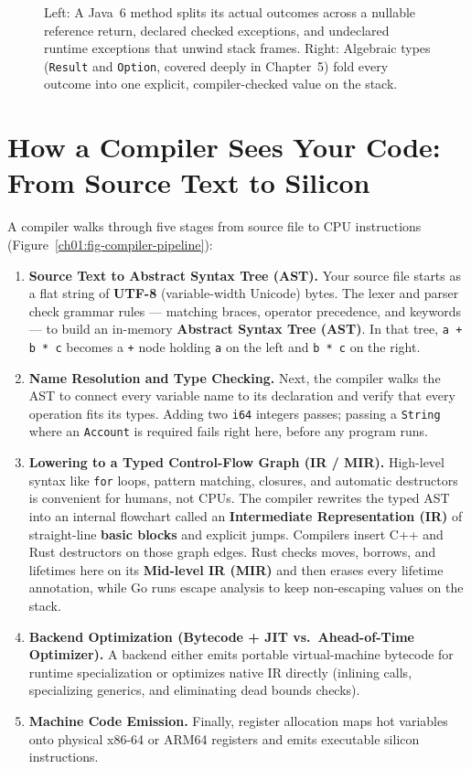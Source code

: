 \begin{figure}[H]
\caption{Left: A Java~6 method splits its actual outcomes across a nullable reference return, declared checked exceptions, and undeclared runtime exceptions that unwind stack frames. Right: Algebraic types (\texttt{Result} and \texttt{Option}, covered deeply in Chapter~5) fold every outcome into one explicit, compiler-checked value on the stack.}
\label{ch01:fig-honest-signatures}
\end{figure}

\section{How a Compiler Sees Your Code: From Source Text to Silicon}
\label{ch01:compiler-pipeline}

A compiler walks through five stages from source file to CPU instructions (Figure~\ref{ch01:fig-compiler-pipeline}):

\begin{enumerate}
  \item \textbf{Source Text to Abstract Syntax Tree (AST).} Your source file starts as a flat string of \textbf{UTF-8} (variable-width Unicode) bytes. The lexer and parser check grammar rules --- matching braces, operator precedence, and keywords --- to build an in-memory \textbf{Abstract Syntax Tree (AST)}. In that tree, \texttt{a + b * c} becomes a \texttt{+} node holding \texttt{a} on the left and \texttt{b * c} on the right.
  \item \textbf{Name Resolution and Type Checking.} Next, the compiler walks the AST to connect every variable name to its declaration and verify that every operation fits its types. Adding two \texttt{i64} integers passes; passing a \texttt{String} where an \texttt{Account} is required fails right here, before any program runs.
  \item \textbf{Lowering to a Typed Control-Flow Graph (IR / MIR).} High-level syntax like \texttt{for} loops, pattern matching, closures, and automatic destructors is convenient for humans, not CPUs. The compiler rewrites the typed AST into an internal flowchart called an \textbf{Intermediate Representation (IR)} of straight-line \textbf{basic blocks} and explicit jumps. Compilers insert C++ and Rust destructors on those graph edges. Rust checks moves, borrows, and lifetimes here on its \textbf{Mid-level IR (MIR)} and then erases every lifetime annotation, while Go runs escape analysis to keep non-escaping values on the stack.
  \item \textbf{Backend Optimization (Bytecode + JIT vs.\ Ahead-of-Time Optimizer).} A backend either emits portable virtual-machine bytecode for runtime specialization or optimizes native IR directly (inlining calls, specializing generics, and eliminating dead bounds checks).
  \item \textbf{Machine Code Emission.} Finally, register allocation maps hot variables onto physical x86-64 or ARM64 registers and emits executable silicon instructions.
\end{enumerate}

